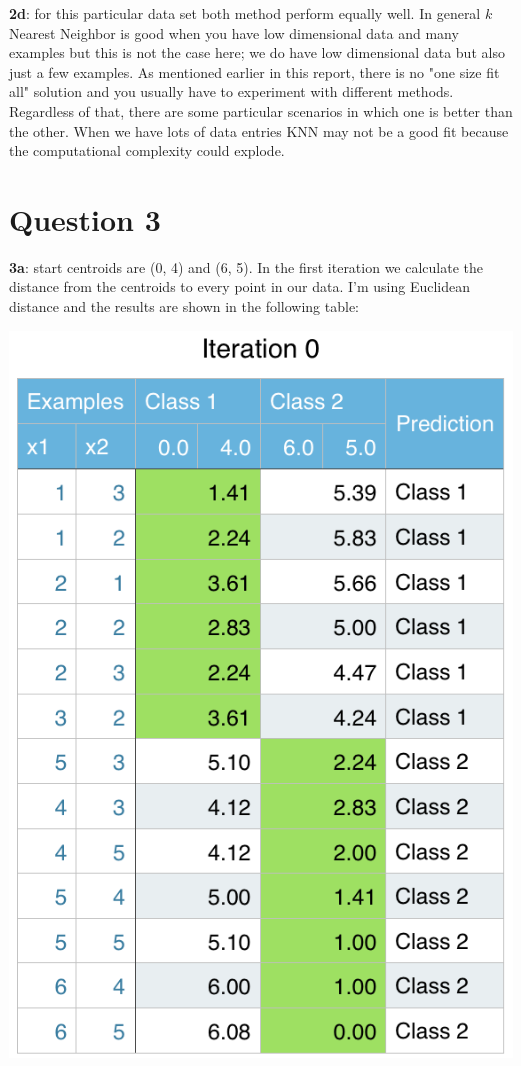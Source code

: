 \documentclass[11pt]{article}
\begin{document}
\textbf{2d}: for this particular data set both method perform equally well. In general $k$ Nearest Neighbor is good when you have low dimensional data and many examples but this is not the case here; we do have low dimensional data but also just a few examples. As mentioned earlier in this report, there is no "one size fit all" solution and you usually have to experiment with different methods. Regardless of that, there are some particular scenarios in which one is better than the other. When we have lots of data entries KNN may not be a good fit because the computational complexity could explode. 

\section*{Question 3}

\textbf{3a}: start centroids are (0, 4) and (6, 5). In the first iteration we calculate the distance from the centroids to every point in our data. I'm using Euclidean distance and the results are shown in the following table:

\begin{center}
\includegraphics[scale=0.75]{kmeans-iter0.png}
\end{center}
\end{document}
